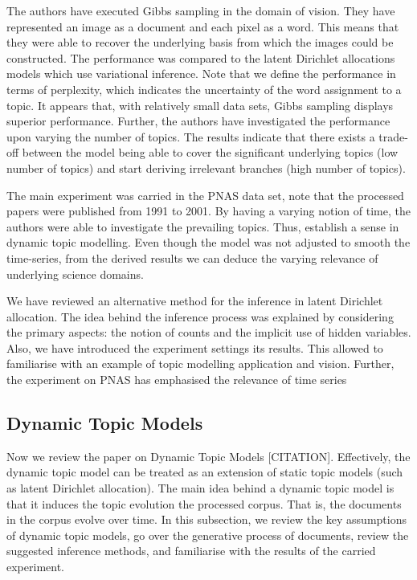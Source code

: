 \documentclass{mprop}
\begin{document}
\par The authors have executed Gibbs sampling in the domain of vision. They have represented an image as a document and each pixel as a word. This means that they were able to recover the underlying basis from which the images could be constructed. The performance was compared to the latent Dirichlet allocations models which use variational inference. Note that we define the performance in terms of perplexity, which indicates the uncertainty of the word assignment to a topic. It appears that, with relatively small data sets, Gibbs sampling displays superior performance. Further, the authors have investigated the performance upon varying the number of topics. The results indicate that there exists a trade-off between the model being able to cover the significant underlying topics (low number of topics) and start deriving irrelevant branches (high number of topics).

\par The main experiment was carried in the PNAS data set, note that the processed papers were published from 1991 to 2001. By having a varying notion of time, the authors were able to investigate the prevailing topics. Thus, establish a sense in dynamic topic modelling. Even though the model was not adjusted to smooth the time-series, from the derived results we can deduce the varying relevance of underlying science domains.  

\par We have reviewed an alternative method for the inference in latent Dirichlet allocation. The idea behind the inference process was explained by considering the primary aspects: the notion of counts and the implicit use of hidden variables. Also, we have introduced the experiment settings its results. This allowed to familiarise with an example of topic modelling application and vision. Further, the experiment on PNAS has emphasised the relevance of time series

\subsection{Dynamic Topic Models}

\par Now we review the paper on Dynamic Topic Models [CITATION]. Effectively, the dynamic topic model can be treated as an extension of static topic models (such as latent Dirichlet allocation). The main idea behind a dynamic topic model is that it induces the topic evolution the processed corpus. That is, the documents in the corpus evolve over time. In this subsection, we review the key assumptions of dynamic topic models, go over the generative process of documents, review the suggested inference methods, and familiarise with the results of the carried experiment. 
\end{document}
